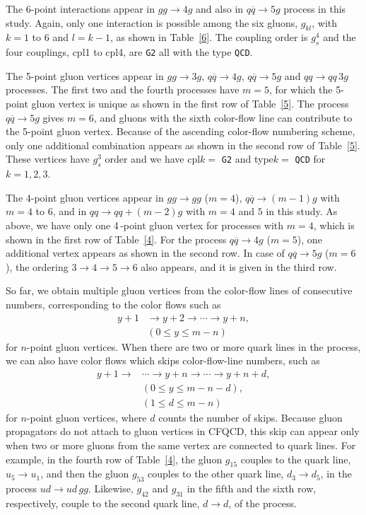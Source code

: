 \documentclass[a4paper,11pt]{article}
\begin{document}
The 6-point interactions appear in $gg\rightarrow 4g$ and also in
$q\overline{q}\rightarrow 5g$ process in this study. Again, only one
interaction is possible among the six gluons, $g_{kl}$, with $k=1$ to
$6$ and $l=k-1$, as shown in Table~\ref{6}. The coupling order is
$g_s^4$ and the four couplings, cpl1 to cpl4, are {\tt G2} all with the type
{\tt QCD}.

The 5-point gluon vertices appear in $gg\rightarrow 3g$,
$q\overline{q}\rightarrow 4g$, $q\overline{q}\rightarrow 5g$ and $qq\rightarrow
qq\,3g$ processes. The first two and the fourth processes have $m=5$, for which
the 5-point gluon vertex is unique as shown in the first row of
Table~\ref{5}. The process $q\overline{q}\rightarrow 5g$ gives $m=6$,
and gluons with the sixth color-flow line can contribute to the 5-point gluon
vertex. Because of the ascending color-flow numbering scheme, only one
additional combination appears as shown in the second row of
Table~\ref{5}. These vertices have $g_s^3$ order and we have cpl$k=$ {\tt G2}
and type$k=$ {\tt QCD} for $k=1,2,3$.

The 4-point gluon vertices appear in $gg\rightarrow gg$
($m=4$), $q\overline{q}\rightarrow (m-1)g$ with $m=4$ to $6$, and in
$qq\rightarrow qq+(m-2)g$ with $m=4$ and $5$ in this study. As above, we
have only one 4\,-point gluon vertex for processes with $m=4$, which is shown in
the first row of Table~\ref{4}. For the process $q\overline{q}\rightarrow
4g$ ($m=5$), one additional vertex appears as shown in the second
row. In case of $q\overline{q}\rightarrow 5g$ ($m=6$), the ordering
$3\rightarrow 4\rightarrow 5\rightarrow 6$ also appears, and it is given
in the third row.

So far, we obtain multiple gluon vertices from the color-flow lines of consecutive numbers, corresponding to the color flows
such as
\begin{align}
  y+1&\rightarrow y+2\rightarrow \cdots \rightarrow y+n,\nonumber\\
    &(0\leq y\leq m-n)
\end{align}
 for $n$-point gluon
vertices. When there are two or more quark lines in
the process, we can also have color flows which skips color-flow-line numbers, such as
\begin{align}
 y+1\rightarrow& \cdots \rightarrow y+n\rightarrow \cdots \rightarrow y+n+d,\nonumber\\
 &(0\leq y \leq m-n-d),\nonumber\\
  &(1 \leq d\leq m-n)
\end{align}
for $n$-point gluon vertices, where $d$ counts the number of
skips. Because gluon propagators do not attach to gluon vertices in CFQCD, this skip can appear only when
two or more gluons from the same vertex are connected to quark lines.
 For example, in the fourth row of Table~\ref{4},
the gluon $g_{15}$ couples to the quark line, $u_5\rightarrow u_1$,
and then
the gluon $g_{53}$ couples to the other quark line, $d_3\rightarrow d_5$, in the
process $ud\rightarrow ud\,gg$. Likewise, $g_{42}$ and $g_{31}$ in the
fifth and the sixth row, respectively, couple to the
second quark line, $d\rightarrow d$, of the process.
\end{document}
